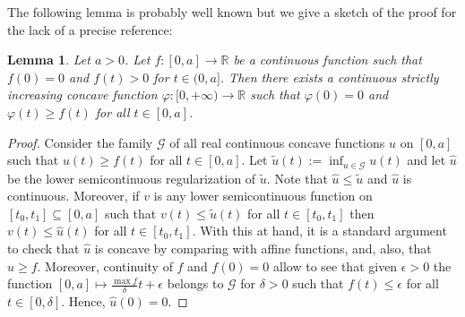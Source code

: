 \documentclass[12pt]{amsart}
\newtheorem{lemma}[theorem]{Lemma}
\theoremstyle{definition}
\theoremstyle{remark}
\numberwithin{equation}{section}
\def\R{\mathbb R}
\begin{document}
{The following lemma is probably well known but we give a sketch of the proof for the lack of a precise reference:}
\begin{lemma}\label{Lem:concave}
{ Let $a>0$. Let $f:[0,a]\to\R$ be a continuous  function such that $f(0)=0$ and $f(t)>0$ for $t\in (0,a]$. Then there exists a continuous strictly increasing concave function $\varphi:[0,+\infty)\to \R$ such that $\varphi(0)=0$ and $\varphi(t)\geq f(t)$ for all $t\in [0,a]$.}
\end{lemma}

\begin{proof}
Consider the family $\mathcal G$ of all real continuous concave functions $u$ on $[0,a]$ such that $u(t)\geq f(t)$ for all $t\in [0,a]$. Let $\tilde u(t):=\inf_{u\in \mathcal G}u(t)$ and let $\hat u$ be the lower semicontinuous regularization of $\tilde u$. Note that $\hat u\leq \tilde u$ and $\hat u$ is continuous.  Moreover, if $v$ is any lower semicontinuous function on $[t_0,t_1]\subseteq [0,a]$ such that $v(t)\leq \tilde u(t)$ for all $t\in [t_0,t_1]$ then $v(t)\leq \hat u(t)$ for all $t\in [t_0,t_1]$. With this at hand, it is a standard argument to check that $\hat u$ is concave by comparing with affine functions, and, also, that $\hat u\geq f$. Moreover, continuity of $f$ and $f(0)=0$ allow to see that given $\epsilon>0$ the function $[0,a]\mapsto \frac{\max f}{\delta}t+\epsilon$ belongs to $\mathcal G$ for $\delta>0$ such that $f(t)\leq \epsilon$ for all $t\in [0,\delta]$. Hence, $\hat u(0)=0$.

\end{proof}
\end{document}
